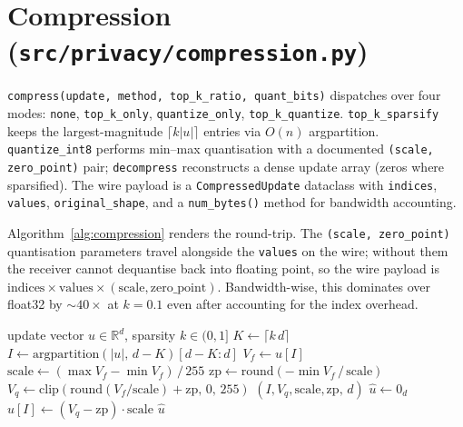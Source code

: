 \documentclass[11pt,a4paper]{report}
\begin{document}
\section{Compression (\texttt{src/privacy/compression.py})}

\texttt{compress(update, method, top\_k\_ratio, quant\_bits)} dispatches over
four modes: \texttt{none}, \texttt{top\_k\_only}, \texttt{quantize\_only},
\texttt{top\_k\_quantize}. \texttt{top\_k\_sparsify} keeps the largest-magnitude
$\lceil k|u|\rceil$ entries via $O(n)$ argpartition.
\texttt{quantize\_int8} performs min--max quantisation with a documented
\texttt{(scale, zero\_point)} pair; \texttt{decompress} reconstructs a dense
update array (zeros where sparsified). The wire payload is a
\texttt{CompressedUpdate} dataclass with \texttt{indices}, \texttt{values},
\texttt{original\_shape}, and a \texttt{num\_bytes()} method for bandwidth
accounting.

Algorithm~\ref{alg:compression} renders the round-trip. The
\texttt{(scale, zero\_point)} quantisation parameters travel alongside the
\texttt{values} on the wire; without them the receiver cannot dequantise
back into floating point, so the wire payload is
$\mathrm{indices} \times \mathrm{values} \times (\mathrm{scale},
\mathrm{zero\_point})$. Bandwidth-wise, this dominates over float32 by
$\sim$$40\times$ at $k = 0.1$ even after accounting for the index overhead.

\begin{algorithm}[h]
\caption{Top-$k$ + int8 compression round-trip}\label{alg:compression}
\begin{algorithmic}[1]
\Require update vector $u \in \mathbb{R}^d$, sparsity $k \in (0,1]$
  \State $K \gets \lceil k\,d \rceil$
  \State $I \gets \mathrm{argpartition}(|u|,\, d - K)[d - K{:}d]$ 
  \State $V_f \gets u[I]$ 
  \State $\mathrm{scale} \gets (\max V_f - \min V_f) \,/\, 255$
  \State $\mathrm{zp} \gets \mathrm{round}(-\min V_f \,/\, \mathrm{scale})$
  \State $V_q \gets \mathrm{clip}(\mathrm{round}(V_f / \mathrm{scale}) + \mathrm{zp},\, 0,\, 255)$ 
  \State \Return $(I, V_q, \mathrm{scale}, \mathrm{zp},\, d)$
\EndFunction
\Statex
{}
  \State $\hat u \gets 0_d$
  \State $\hat u[I] \gets (V_q - \mathrm{zp}) \cdot \mathrm{scale}$
  \State \Return $\hat u$ 
\EndFunction
\end{algorithmic}
\end{algorithm}
\end{document}
